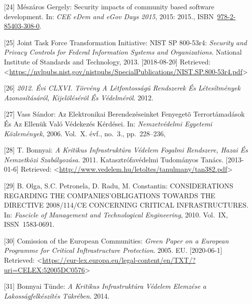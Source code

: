 \documentclass[12pt,magyar,a4paper,oneside]{scrreprt}
\newenvironment{cslreferences}%
  {}%
  {\par}
\begin{document}
\begin{cslreferences}
\leavevmode\hypertarget{ref-meszaros_gergely_security_2015}{}%
{[}24{]} Mészáros Gergely: Security impacts of community based software
development. In: \emph{CEE e\textbar Dem and e\textbar Gov Days 2015},
2015: 2015.,
ISBN~\href{https://worldcat.org/isbn/978-2-85403-308-0}{978-2-85403-308-0}.

\leavevmode\hypertarget{ref-joint_task_force_transformation_initiative_security_2013}{}%
{[}25{]} Joint Task Force Transformation Initiative: NIST SP 800-53r4:
\emph{Security and Privacy Controls for Federal Information Systems and
Organizations}. National Institute of Standards and Technology, 2013.
{[}2018-08-20{]} Retrieved:
\textless{}\url{https://nvlpubs.nist.gov/nistpubs/SpecialPublications/NIST.SP.800-53r4.pdf}\textgreater{}

\leavevmode\hypertarget{ref-noauthor_2012._2012}{}%
{[}26{]} \emph{2012. Évi CLXVI. Törvény A Létfontosságú Rendszerek És
Létesítmények Azonosításáról, Kijelölésérõl És Védelmérõl}. 2012.

\leavevmode\hypertarget{ref-vass_sandor_az_2006}{}%
{[}27{]} Vass Sándor: Az Elektronikai Berendezéseinket Fenyegetõ
Terrortámadások És Az Ellenük Való Védekezés Kérdései. In:
\emph{Nemzetvédelmi Egyetemi Közlemények}, 2006. Vol.~X. évf., no.~3.,
pp.~228--236,

\leavevmode\hypertarget{ref-bonnyai_kritikus_2011}{}%
{[}28{]} T. Bonnyai: \emph{A Kritikus Infrastruktúra Védelem Fogalmi
Rendszere, Hazai És Nemzetközi Szabályozása}. 2011. Katasztrófavédelmi
Tudományos Tanács. {[}2013-01-6{]} Retrieved:
\textless{}\url{http://www.vedelem.hu/letoltes/tanulmany/tan382.pdf}\textgreater{}

\leavevmode\hypertarget{ref-olga_considerations_2010}{}%
{[}29{]} B. Olga, S.C. Petronela, D. Radu, M. Constantin: CONSIDERATIONS
REGARDING THE COMPANIES'OBLIGATIONS TOWARDS THE DIRECTIVE 2008/114/CE
CONCERNING CRITICAL INFRASTRUCTURES. In: \emph{Fascicle of Management
and Technological Engineering}, 2010. Vol.~IX, ISSN~1583-0691.

\leavevmode\hypertarget{ref-comission_of_the_european_communities_green_2005}{}%
{[}30{]} Comission of the European Communities: \emph{Green Paper on a
European Programme for Critical Inftrastructure Protection}. 2005. EU.
{[}2020-06-1{]} Retrieved:
\textless{}\url{https://eur-lex.europa.eu/legal-content/en/TXT/?uri=CELEX:52005DC0576}\textgreater{}

\leavevmode\hypertarget{ref-bonnyai_tunde_kritikus_2014}{}%
{[}31{]} Bonnyai Tünde: \emph{A Kritikus Infrastruktúra Védelem Elemzése
a Lakosságfelkészítés Tükrében}. 2014.


\end{cslreferences}
\end{document}
